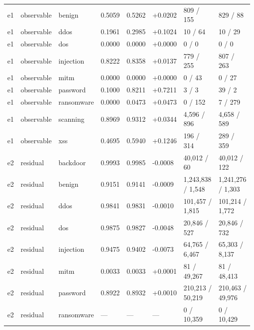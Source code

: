 \begin{landscape}
\begin{longtable}
{}e1 & observable & benign & 0.5059 & 0.5262 & +\allowbreak{}0.0202 & 809 /\allowbreak{} 155 & 829 /\allowbreak{} 88 \\
{}e1 & observable & ddos & 0.1961 & 0.2985 & +\allowbreak{}0.1024 & 10 /\allowbreak{} 64 & 10 /\allowbreak{} 29 \\
{}e1 & observable & dos & 0.0000 & 0.0000 & +\allowbreak{}0.0000 & 0 /\allowbreak{} 0 & 0 /\allowbreak{} 0 \\
{}e1 & observable & injection & 0.8222 & 0.8358 & +\allowbreak{}0.0137 & 779 /\allowbreak{} 255 & 807 /\allowbreak{} 263 \\
{}e1 & observable & mitm & 0.0000 & 0.0000 & +\allowbreak{}0.0000 & 0 /\allowbreak{} 43 & 0 /\allowbreak{} 27 \\
{}e1 & observable & password & 0.1000 & 0.8211 & +\allowbreak{}0.7211 & 3 /\allowbreak{} 3 & 39 /\allowbreak{} 2 \\
{}e1 & observable & ransomware & 0.0000 & 0.0473 & +\allowbreak{}0.0473 & 0 /\allowbreak{} 152 & 7 /\allowbreak{} 279 \\
{}e1 & observable & scanning & 0.8969 & 0.9312 & +\allowbreak{}0.0344 & 4,596 /\allowbreak{} 896 & 4,658 /\allowbreak{} 589 \\
{}e1 & observable & xss & 0.4695 & 0.5940 & +\allowbreak{}0.1246 & 196 /\allowbreak{} 314 & 289 /\allowbreak{} 359 \\
{}e2 & residual & backdoor & 0.9993 & 0.9985 & -0.0008 & 40,012 /\allowbreak{} 60 & 40,012 /\allowbreak{} 122 \\
{}e2 & residual & benign & 0.9151 & 0.9141 & -0.0009 & 1,243,838 /\allowbreak{} 1,548 & 1,241,276 /\allowbreak{} 1,303 \\
{}e2 & residual & ddos & 0.9841 & 0.9831 & -0.0010 & 101,457 /\allowbreak{} 1,815 & 101,214 /\allowbreak{} 1,772 \\
{}e2 & residual & dos & 0.9875 & 0.9827 & -0.0048 & 20,846 /\allowbreak{} 527 & 20,846 /\allowbreak{} 732 \\
{}e2 & residual & injection & 0.9475 & 0.9402 & -0.0073 & 64,765 /\allowbreak{} 6,467 & 65,303 /\allowbreak{} 8,137 \\
{}e2 & residual & mitm & 0.0033 & 0.0033 & +\allowbreak{}0.0001 & 81 /\allowbreak{} 49,267 & 81 /\allowbreak{} 48,413 \\
{}e2 & residual & password & 0.8922 & 0.8932 & +\allowbreak{}0.0010 & 210,213 /\allowbreak{} 50,219 & 210,463 /\allowbreak{} 49,976 \\
{}e2 & residual & ransomware & — & — & — & 0 /\allowbreak{} 10,359 & 0 /\allowbreak{} 10,429 \\

\end{longtable}
\end{landscape}
